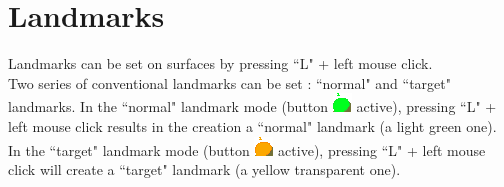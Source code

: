 \section{Landmarks}
Landmarks can be set on surfaces by pressing ``L" + left mouse click.\\

Two series of conventional landmarks can be set : ``normal" and ``target" landmarks. In the ``normal" landmark mode (button \includegraphics[scale=0.7]{images/04/normal_landmarks.png} active), pressing ``L" + left mouse click results in the creation a ``normal" landmark (a light green one). In the ``target" landmark mode (button \includegraphics[scale=0.7]{images/04/target_landmarks.png} active),
pressing ``L" + left mouse click will create a ``target" landmark (a yellow transparent one).


